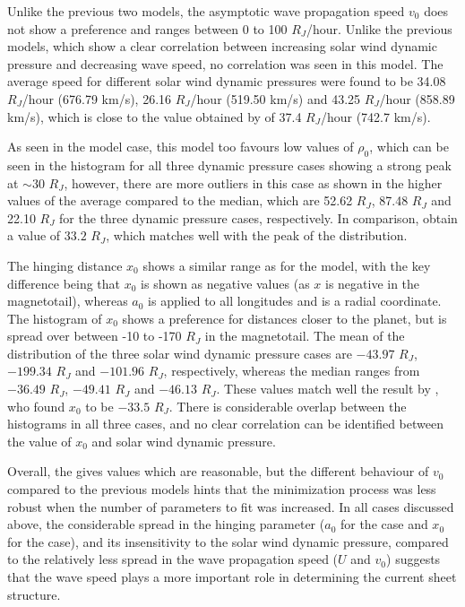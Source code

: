 Unlike the previous two models, the asymptotic wave propagation speed $v_0$ does not show a preference and ranges between 0 to 100 $R_J$/hour. Unlike the previous models, which show a clear correlation between increasing solar wind dynamic pressure and decreasing wave speed, no correlation was seen in this model. The average speed for different solar wind dynamic pressures were found to be 34.08 $R_J$/hour (676.79 km/s), 26.16 $R_J$/hour (519.50 km/s) and 43.25 $R_J$/hour (858.89 km/s), which is close to the value obtained by  of 37.4 $R_J$/hour (742.7 km/s). 

As seen in the  model case, this model too favours low values of $\rho_0$, which can be seen in the histogram for all three dynamic pressure cases showing a strong peak at $\sim30$ $R_J$, however, there are more outliers in this case as shown in the higher values of the average compared to the median, which are 52.62 $R_J$, 87.48 $R_J$ and 22.10 $R_J$ for the three dynamic pressure cases, respectively. In comparison,  obtain a value of $33.2$ $R_J$, which matches well with the peak of the distribution. 

The hinging distance $x_0$ shows a similar range as for the  model, with the key difference being that $x_0$ is shown as negative values (as $x$ is negative in the magnetotail), whereas $a_0$ is applied to all longitudes and is a radial coordinate. The histogram of $x_0$ shows a preference for distances closer to the planet, but is spread over between -10 to -170 $R_J$ in the magnetotail. The mean of the distribution of the three solar wind dynamic pressure cases are $-43.97$ $R_J$, $-199.34$ $R_J$ and $-101.96$ $R_J$, respectively, whereas the median ranges from $-36.49$ $R_J$, $-49.41$ $R_J$ and $-46.13$ $R_J$. These values match well the result by , who found $x_0$ to be $-33.5$ $R_J$. There is considerable overlap between the histograms in all three cases, and no clear correlation can be identified between the value of $x_0$ and solar wind dynamic pressure. 

Overall, the  gives values which are reasonable, but the different behaviour of $v_0$ compared to the previous models hints that the minimization process was less robust when the number of parameters to fit was increased. In all cases discussed above, the considerable spread in the hinging parameter ($a_0$ for the  case and $x_0$ for the  case), and its insensitivity to the solar wind dynamic pressure, compared to the relatively less spread in the wave propagation speed ($U$ and $v_0$) suggests that the wave speed plays a more important role in determining the current sheet structure. 

